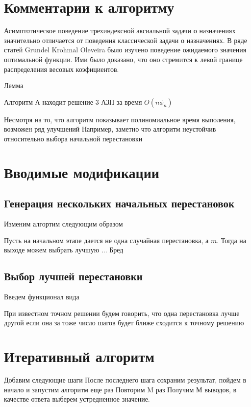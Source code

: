 \section{Комментарии к алгоритму}
Асимптотическое поведение трехиндексной аксиальной задачи о назначениях значительно отличается от поведения 
классической задачи о назначениях. В ряде статей Grundel Krohmal Oleveira было изучено поведение ожидаемого значения  оптимальной функции. 
Ими было доказано, что оно стремится к левой границе распределения весовых коэфициентов.

Лемма

Алгоритм А находит решение 3-АЗН за время $O(n \phi_n)$

Несмотря на то, что алгоритм показывает полиномиальное время выполения, возможен ряд улучшений
Например, заметно что алгоритм неустойчив относительно выбора начальной перестановки
\section{Вводимые модификации}
\subsection{Генерация нескольких начальных перестановок}
Изменим алгортим следующим образом

Пусть на начальном этапе дается не одна случайная перестановка, 
а $m$. Тогда на выходе можем выбрать лучшую ... Бред
\subsection{Выбор лучшей перестановки}
Введем функционал вида 

При известном точном решении будем говорить, что одна перестановка лучше другой
если она за тоже число шагов будет ближе сходится к точному решению 


\section{Итеративный алгоритм}
Добавим следующие шаги
После последнего шага сохраним результат, пойдем в начало и запустим алгоритм еще раз
Повторим M раз
Получим М выводов, в качестве ответа выберем устредненное значение. 